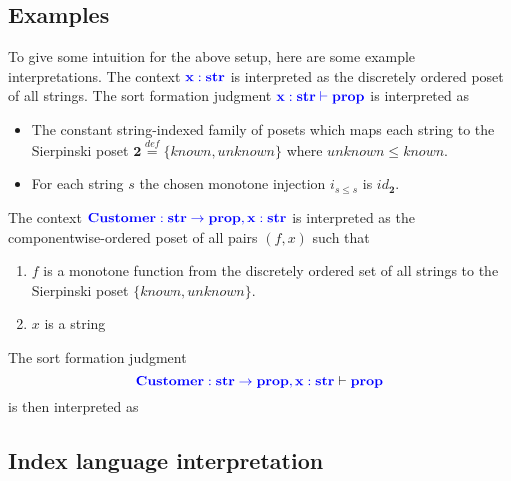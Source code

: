 \documentclass{article}
\newtheorem{lemma}{Lemma}
\newcommand{\blu}[1]{\mathbf{\color{blue}{#1}}}
\newcommand{\mbf}{\mathbf}
\newcommand{\defeq}{\overset{\mathit{def}}{=}}
\newcommand{\fm}[2]{
\left(
\tiny
#1
\normalsize
\right)_{#2}
}
\begin{document}

\subsection*{Examples}

To give some intuition for the above setup, here are some example interpretations. The context $\blu{x : str}$ is interpreted as the discretely ordered poset of all strings. The sort formation judgment $\blu{x : str \vdash prop}$ is interpreted as 

\begin{itemize}
\item The constant string-indexed family of posets which maps each string to the Sierpinski poset $\mbf{2} \defeq \{ \mathit{known}, \mathit{unknown} \}$ where $\mathit{unknown} \leq \mathit{known}$.
\item For each string $s$ the chosen monotone injection $i_{s \leq s}$ is $\mathit{id}_{\mbf{2}}$.  
\end{itemize}
 
The context $\blu{Customer : str \to prop,x:str}$ is interpreted as the componentwise-ordered poset of all pairs $(f,x)$ such that
\begin{enumerate}
\item $f$ is a monotone function from the discretely ordered set of all strings to the Sierpinski poset $\{ \mathit{known}, \mathit{unknown} \}$.
\item $x$ is a string
\end{enumerate}
The sort formation judgment
$$\blu{Customer : str \to prop,x:str} \vdash \blu{prop}$$ 
is then interpreted as 

\subsection*{Index language interpretation}
\end{document}
